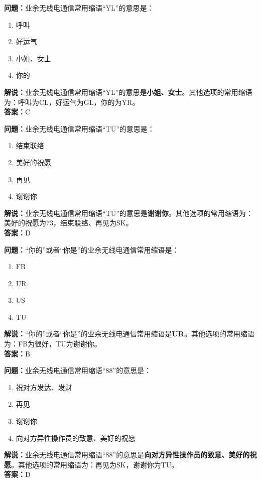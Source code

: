 \bigskip


\noindent\textbf{问题：}业余无线电通信常用缩语“YL”的意思是：
\begin{enumerate}[label=\Alph*), leftmargin=3em]
\item 呼叫
\item 好运气
\item 小姐、女士
\item 你的
\end{enumerate}
\noindent\textbf{解说：}业余无线电通信常用缩语“YL”的意思是\textbf{小姐、女士}。其他选项的常用缩语为：呼叫为CL，好运气为GL，你的为YR。\\\noindent\textbf{答案：}C




\bigskip


\noindent\textbf{问题：}业余无线电通信常用缩语“TU”的意思是：
\begin{enumerate}[label=\Alph*), leftmargin=3em]
\item 结束联络
\item 美好的祝愿
\item 再见
\item 谢谢你
\end{enumerate}
\noindent\textbf{解说：}业余无线电通信常用缩语“TU”的意思是\textbf{谢谢你}。其他选项的常用缩语为：美好的祝愿为73，结束联络、再见为SK。\\\noindent\textbf{答案：}D



\bigskip


\noindent\textbf{问题：}“你的”或者“你是”的业余无线电通信常用缩语是：
\begin{enumerate}[label=\Alph*), leftmargin=3em]
\item FB
\item UR
\item US
\item TU
\end{enumerate}
\noindent\textbf{解说：}“你的”或者“你是”的业余无线电通信常用缩语是\textbf{UR}。其他选项的常用缩语为：FB为很好，TU为谢谢你。\\\noindent\textbf{答案：}B



\bigskip


\noindent\textbf{问题：}业余无线电通信常用缩语“88”的意思是：
\begin{enumerate}[label=\Alph*), leftmargin=3em]
\item 祝对方发达、发财
\item 再见
\item 谢谢你
\item 向对方异性操作员的致意、美好的祝愿
\end{enumerate}
\noindent\textbf{解说：}业余无线电通信常用缩语“88”的意思是\textbf{向对方异性操作员的致意、美好的祝愿}。其他选项的常用缩语为：再见为SK，谢谢你为TU。\\\noindent\textbf{答案：}D



